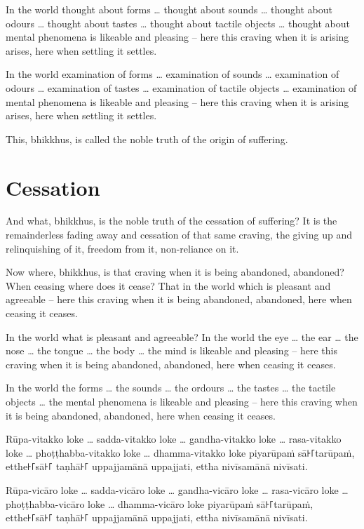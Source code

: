 \englishPage

In the world thought about forms \ldots{} thought about sounds \ldots{} thought
about odours \ldots{} thought about tastes \ldots{} thought about tactile
objects \ldots{} thought about mental phenomena is likeable and pleasing -- here
this craving when it is arising arises, here when settling it settles.

In the world examination of forms \ldots{} examination of sounds \ldots{}
examination of odours \ldots{} examination of tastes \ldots{} examination of
tactile objects \ldots{} examination of mental phenomena is likeable and
pleasing -- here this craving when it is arising arises, here when settling it
settles.

This, bhikkhus, is called the noble truth of the origin of suffering.

\section{Cessation}

And what, bhikkhus, is the noble truth of the cessation of suffering? It is the
remainderless fading away and cessation of that same craving, the giving up and
relinquishing of it, freedom from it, non-reliance on it.

Now where, bhikkhus, is that craving when it is being abandoned, abandoned? When
ceasing where does it cease? That in the world which is pleasant and agreeable
-- here this craving when it is being abandoned, abandoned, here when ceasing it
ceases.

In the world what is pleasant and agreeable? In the world the eye \ldots{} the
ear \ldots{} the nose \ldots{} the tongue \ldots{} the body \ldots{} the mind is
likeable and pleasing -- here this craving when it is being abandoned, abandoned,
here when ceasing it ceases.

In the world the forms \ldots{} the sounds \ldots{} the ordours \ldots{} the
tastes \ldots{} the tactile objects \ldots{} the mental phenomena is likeable
and pleasing -- here this craving when it is being abandoned, abandoned, here
when ceasing it ceases.

\paliPage

Rūpa-vitakko loke \ldots{} sadda-vitakko loke \ldots{} gandha-vitakko loke \ldots{}
rasa-vitakko loke \ldots{} phoṭṭhabba-vitakko loke \ldots{} dhamma-vitakko loke
piyarūpaṁ sā꜔꜒tarūpaṁ, etthe꜔꜒sā꜔꜒ taṇhā꜔꜒ uppajjamānā uppajjati, ettha nivīsamānā
nivīsati.

Rūpa-vicāro loke \ldots{} sadda-vicāro loke \ldots{} gandha-vicāro loke \ldots{}
rasa-vicāro loke \ldots{} phoṭṭhabba-vicāro loke \ldots{} dhamma-vicāro loke
piyarūpaṁ sā꜔꜒tarūpaṁ, etthe꜔꜒sā꜔꜒ taṇhā꜔꜒ uppajjamānā uppajjati, ettha nivīsamānā
nivīsati.

